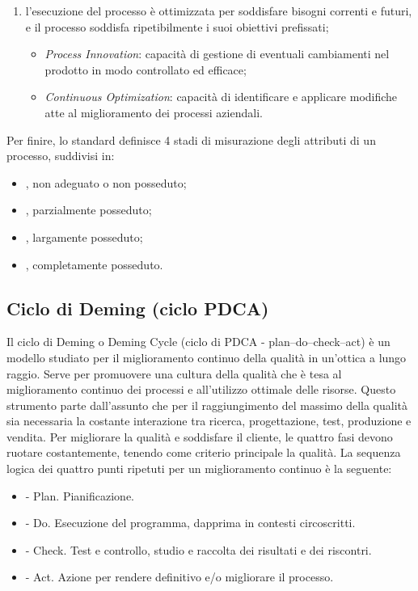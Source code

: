 \begin{enumerate}
\begin{itemize}
\end{itemize}
\item  {} l'esecuzione del processo è ottimizzata per soddisfare bisogni correnti e futuri, e il processo soddisfa ripetibilmente i suoi obiettivi prefissati;
\begin{itemize}
\item \emph{Process Innovation}: capacità di gestione di eventuali cambiamenti nel prodotto in modo controllato ed efficace;
\item \emph{Continuous Optimization}: capacità di identificare e applicare modifiche atte al miglioramento dei processi aziendali.
\end{itemize}
\end{enumerate}
Per finire, lo standard definisce 4 stadi di misurazione degli attributi di un processo, suddivisi in:
\begin{itemize}
\item {}, non adeguato o non posseduto;
\item {}, parzialmente posseduto;
\item {}, largamente posseduto;
\item {}, completamente posseduto.
\end{itemize}

\subsection{Ciclo di Deming (ciclo PDCA)} %

Il ciclo di Deming o Deming Cycle (ciclo di PDCA - plan–do–check–act) è un modello studiato per il miglioramento continuo della qualità in un'ottica a lungo raggio. Serve per promuovere una cultura della qualità che è tesa al miglioramento continuo dei processi e all'utilizzo ottimale delle risorse. Questo strumento parte dall'assunto che per il raggiungimento del massimo della qualità sia necessaria la costante interazione tra ricerca, progettazione, test, produzione e vendita. Per migliorare la qualità e soddisfare il cliente, le quattro fasi devono ruotare costantemente, tenendo come criterio principale la qualità.
La sequenza logica dei quattro punti ripetuti per un miglioramento continuo è la seguente:
\begin{itemize}
\item {} - Plan. Pianificazione.
\item {} - Do. Esecuzione del programma, dapprima in contesti circoscritti.
\item {} - Check. Test e controllo, studio e raccolta dei risultati e dei riscontri.
\item {} - Act. Azione per rendere definitivo e/o migliorare il processo.
\end{itemize}

